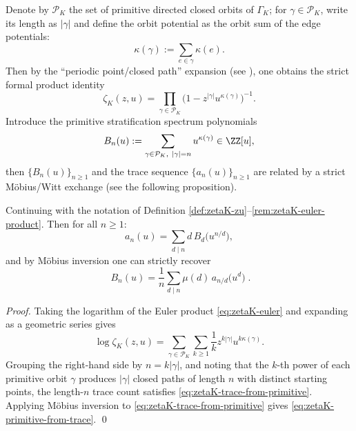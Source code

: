 \begin{remark}\label{rem:zetaK-euler-product}
Denote by \(\mathcal{P}_K\) the set of primitive directed closed orbits of \(\Gamma_K\); for \(\gamma\in\mathcal{P}_K\), write its length as \(|\gamma|\) and define the orbit potential as the orbit sum of the edge potentials:
\[
\kappa(\gamma):=\sum_{e\in\gamma}\kappa(e).
\]
Then by the ``periodic point/closed path'' expansion (see \cite{ParryPollicott1990Zeta,LindMarcus1995}), one obtains the strict formal product identity
\begin{equation}\label{eq:zetaK-euler}
\zeta_K(z,u)=\prod_{\gamma\in\mathcal{P}_K}\bigl(1-z^{|\gamma|}u^{\kappa(\gamma)}\bigr)^{-1}.
\end{equation}
Introduce the primitive stratification spectrum polynomials
\begin{equation}\label{eq:zetaK-Bn}
B_n(u):=\sum_{\gamma\in\mathcal{P}_K,\ |\gamma|=n} u^{\kappa(\gamma)}\in\ZZ[u],
\end{equation}
then \(\{B_n(u)\}_{n\ge 1}\) and the trace sequence \(\{a_n(u)\}_{n\ge 1}\) are related by a strict M\"obius/Witt exchange (see the following proposition).
\end{remark}

\begin{proposition}\label{prop:zetaK-mobius-primitive}
Continuing with the notation of Definition \ref{def:zetaK-zu}--\ref{rem:zetaK-euler-product}. Then for all \(n\ge 1\):
\begin{equation}\label{eq:zetaK-trace-from-primitive}
a_n(u)=\sum_{d\mid n} d\,B_d\!\bigl(u^{n/d}\bigr),
\end{equation}
and by M\"obius inversion one can strictly recover
\begin{equation}\label{eq:zetaK-primitive-from-trace}
\boxed{\;
B_n(u)=\frac{1}{n}\sum_{d\mid n}\mu(d)\,a_{n/d}\!\bigl(u^{d}\bigr)\; }.
\end{equation}
\end{proposition}

\begin{proof}
Taking the logarithm of the Euler product \eqref{eq:zetaK-euler} and expanding as a geometric series gives
\[
\log\zeta_K(z,u)
=\sum_{\gamma\in\mathcal{P}_K}\sum_{k\ge 1}\frac{1}{k}z^{k|\gamma|}u^{k\kappa(\gamma)}.
\]
Grouping the right-hand side by \(n=k|\gamma|\), and noting that the \(k\)-th power of each primitive orbit \(\gamma\) produces \( |\gamma| \) closed paths of length \(n\) with distinct starting points, the length-\(n\) trace count satisfies \eqref{eq:zetaK-trace-from-primitive}. Applying M\"obius inversion to \eqref{eq:zetaK-trace-from-primitive} gives \eqref{eq:zetaK-primitive-from-trace}. \qed
\end{proof}

